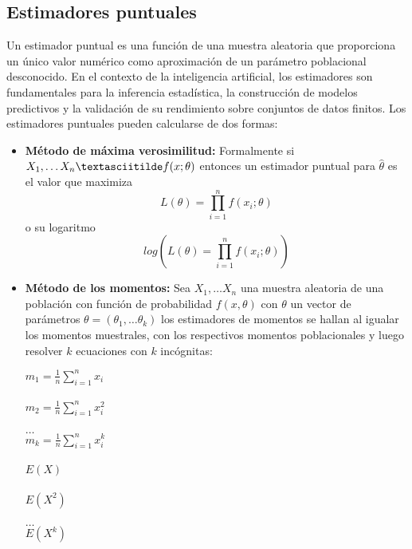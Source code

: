 \documentclass{report}
\begin{document}
\subsection{Estimadores puntuales}
Un estimador puntual es una función de una muestra aleatoria que proporciona un único valor numérico como aproximación de un parámetro poblacional desconocido. En el contexto de la inteligencia artificial, los estimadores son fundamentales para la inferencia estadística, la construcción de modelos predictivos y la validación de su rendimiento sobre conjuntos de datos finitos.
Los estimadores puntuales pueden calcularse de dos formas:
\begin{itemize}
    \item\textbf{Método de máxima verosimilitud:}
    Formalmente si \(X_1, \dots X_n \textasciitilde f(x; \theta)\) entonces un estimador puntual para \(\hat{\theta}\) es el valor que maximiza 
    \[ L(\theta) = \prod_{i=1}^{n}f(x_i ; \theta) \]
    o su logaritmo \[log( L(\theta) = \prod_{i=1}^{n}f(x_i ; \theta) )\]
    \item\textbf{Método de los momentos:}
    Sea \(X_1, \dots X_n\) una muestra aleatoria de una población con función de probabilidad \(f(x, \theta)\) con $\theta$ un vector de parámetros \(\theta=(\theta_1, \dots \theta_k)\) los estimadores de momentos se hallan al igualar los momentos muestrales, con los respectivos momentos poblacionales y luego resolver $k$ ecuaciones con $k$ incógnitas:
    \begin{multicols}{2}
        \(m_1 = \frac{1}{n}\sum_{i=1}^{n}x_i\)\\
        \\
        \(m_2 = \frac{1}{n}\sum_{i=1}^{n}x_i^2\)\\
        \\
        $\dots$\\
        \(m_k = \frac{1}{n}\sum_{i=1}^{n}x_i^k\)\\
        \columnbreak
        \\
        \(E(X)\)\\
        \\
        \(E(X^2)\)\\
        \\
        $\dots$\\
        \(E(X^k)\)
        
    \end{multicols}
\end{itemize}
\iffalse
\subsection{Valores p:}
\fi
\end{document}

